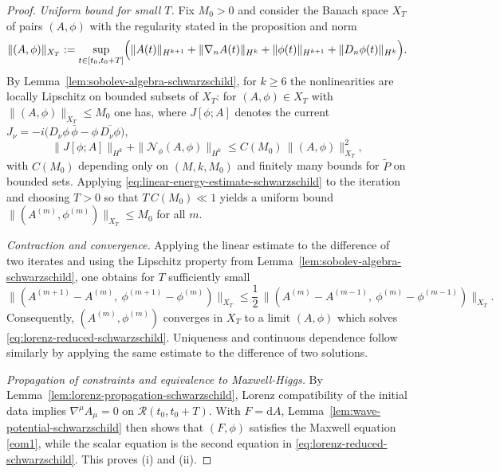 \documentclass[11pt]{article}
\numberwithin{equation}{section}
\theoremstyle{plain}
\theoremstyle{definition}
\theoremstyle{remark}
\newcommand{\dd}{\mathrm{d}}
\begin{document}
\begin{proof}
\smallskip
\noindent\emph{Uniform bound for small $T$.}
Fix $M_0>0$ and consider the Banach space $X_T$ of pairs $(A,\phi)$ with the regularity stated in the proposition and norm
\begin{equation}
\|(A,\phi)\|_{X_T}
:=
\sup_{t\in[t_0,t_0+T]}
\Bigl(
\|A(t)\|_{H^{k+1}}+\|\nabla_n A(t)\|_{H^{k}}
+\|\phi(t)\|_{H^{k+1}}+\|D_n\phi(t)\|_{H^{k}}
\Bigr).
\end{equation}
By Lemma~\ref{lem:sobolev-algebra-schwarzschild}, for $k\ge 6$ the nonlinearities are locally Lipschitz on bounded subsets of $X_T$:
for $(A,\phi)\in X_T$ with $\|(A,\phi)\|_{X_T}\le M_0$ one has, where $J[\phi;A]$ denotes the current $J_\nu=-i\bigl(D_\nu\phi\,\bar\phi-\phi\,\overline{D_\nu\phi}\bigr)$,
\begin{equation}\label{eq:nonlinear-bound-schwarzschild}
\|J[\phi;A]\|_{H^{k}}+\|\mathcal N_\phi(A,\phi)\|_{H^{k}}
\le C(M_0)\,\|(A,\phi)\|_{X_T}^{2},
\end{equation}
with $C(M_0)$ depending only on $(M,k,M_0)$ and finitely many bounds for $\widetilde P$ on bounded sets.
Applying \eqref{eq:linear-energy-estimate-schwarzschild} to the iteration and choosing $T>0$ so that $T\,C(M_0)\ll 1$ yields a uniform bound
$\|(A^{(m)},\phi^{(m)})\|_{X_T}\le M_0$ for all $m$.

\smallskip
\noindent\emph{Contraction and convergence.}
Applying the linear estimate to the difference of two iterates and using the Lipschitz property from Lemma~\ref{lem:sobolev-algebra-schwarzschild},
one obtains for $T$ sufficiently small
\begin{equation}
\|(A^{(m+1)}-A^{(m)},\ \phi^{(m+1)}-\phi^{(m)})\|_{X_T}
\le \frac12\,\|(A^{(m)}-A^{(m-1)},\ \phi^{(m)}-\phi^{(m-1)})\|_{X_T}.
\end{equation}
Consequently, $(A^{(m)},\phi^{(m)})$ converges in $X_T$ to a limit $(A,\phi)$ which solves \eqref{eq:lorenz-reduced-schwarzschild}.
Uniqueness and continuous dependence follow similarly by applying the same estimate to the difference of two solutions.

\smallskip
\noindent\emph{Propagation of constraints and equivalence to Maxwell-Higgs.}
By Lemma~\ref{lem:lorenz-propagation-schwarzschild}, Lorenz compatibility of the initial data implies $\nabla^\mu A_\mu=0$ on $\mathcal R(t_0,t_0+T)$.
With $F=\dd A$, Lemma~\ref{lem:wave-potential-schwarzschild} then shows that $(F,\phi)$ satisfies the Maxwell equation \eqref{eom1}, while the scalar equation is the second equation in \eqref{eq:lorenz-reduced-schwarzschild}.
This proves (i) and (ii).
\end{proof}
\end{document}
